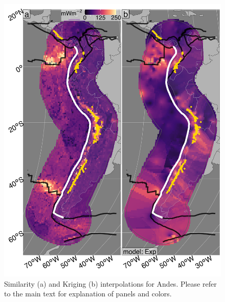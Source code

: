 \begin{figure}[htbp]

{\centering \includegraphics[width=1\linewidth,]{assets/figs/chpt3/AndesDiffComp} 

}

\caption[Similarityand Kriging interpolations for Andes]{Similarity (a) and Kriging (b) interpolations for Andes. Please refer to the main text for explanation of panels and colors.}\label{fig:andesDiff}
\end{figure}

